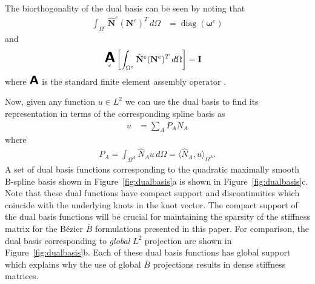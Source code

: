 \documentclass{article}
\DeclareMathOperator*{\A}{ \mathlarger{\mathlarger{\mathlarger{\boldsymbol{\mathsf{A}}}}} }
\begin{document}
The biorthogonality of the dual basis can be seen by noting that
\begin{align}
  \int_{\Omega^e } \hat{\mathbf{N}}^{e} (\mathbf{N}^{e})^T \, d\Omega &= \operatorname{diag}(\boldsymbol{\omega}^e)
\end{align}
and
\begin{align}
\A_{e} \left[\int_{\Omega^e } \hat{\mathbf{N}}^{e} (\mathbf{N}^{e})^T \, d\Omega \right] &= \mathbf{I}
\end{align}
where $\A$ is the standard finite element assembly operator \cite{hughes_finite_2012}.

Now, given any function $u \in L^2$ we can use the dual basis to find its representation in terms of the corresponding spline basis as
\begin{align}
  u &= \sum_A P_A N_A
\end{align}
where
\begin{align}
	P_A = \int_{\Omega^A} \hat{N}_{A} u \, d\Omega = \langle \hat{N}_A, u \rangle_{\Omega^A}.
\end{align}
A set of dual basis functions corresponding to the quadratic maximally smooth B-spline basis shown in Figure~\ref{fig:dualbasis}a is shown in Figure~\ref{fig:dualbasis}c. Note that these dual functions have compact support and discontinuities which coincide with the underlying knots in the knot vector. The compact support of the dual basis functions will be crucial for maintaining the sparsity of the stiffness matrix for the B\'{e}zier $\bar{B}$ formulations presented in this paper. For comparison, the dual basis corresponding to \textit{global} $L^2$ projection are shown in Figure~\ref{fig:dualbasis}b. Each of these dual basis functions has global support which explains why the use of global $\bar{B}$ projections results in dense stiffness matrices. 
\end{document}
